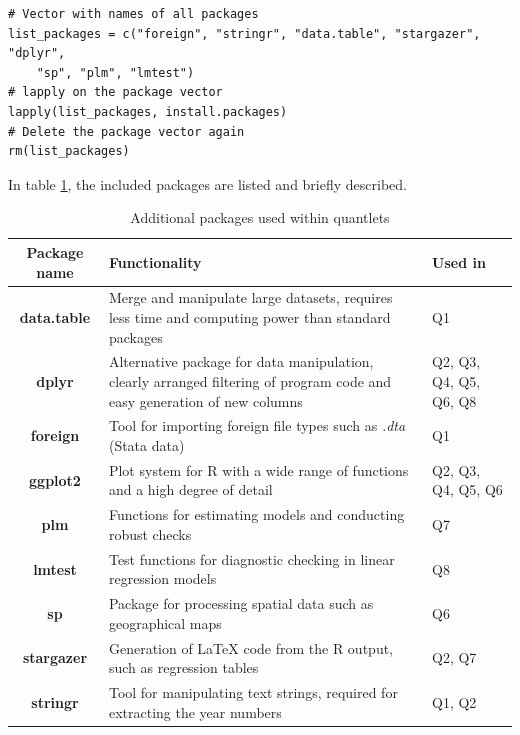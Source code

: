 \documentclass[a4paper]{article}
\begin{document}
\begin{lstlisting}[firstnumber=1]
# Vector with names of all packages
list_packages = c("foreign", "stringr", "data.table", "stargazer", "dplyr", 
	"sp", "plm", "lmtest")
# lapply on the package vector
lapply(list_packages, install.packages)
# Delete the package vector again
rm(list_packages)
\end{lstlisting}

In table \ref{table:packagelist}, the included packages are listed and briefly described.

\begin{table}[htbp]
	\centering
  	\caption{Additional packages used within quantlets} 
  	\label{table:packagelist} 
    \begin{tabular}{|c|p{10cm}|p{}|}
    \hline
    \textbf{Package name} & \textbf{Functionality} & \textbf{Used in} \\ \hline
    \textbf{data.table}   & Merge and manipulate large datasets, requires less time and computing power than standard packages             & Q1                 \\ \hline
    \textbf{dplyr}        & Alternative package for data manipulation, clearly arranged filtering of program code and easy generation of new columns        & Q2, Q3, Q4, Q5, Q6, Q8                 \\ \hline
    \textbf{foreign}      & Tool for importing foreign file types such as \textit{.dta} (Stata data)             & Q1                 \\ 
    \hline \textbf{ggplot2} & Plot system for R with a wide range of functions and a high degree of detail & Q2, Q3, Q4, Q5, Q6  \\
\hline \textbf{plm} & Functions for estimating models and conducting robust checks & Q7  \\
\hline
    \textbf{lmtest}           & Test functions for diagnostic checking in linear regression models              & Q8                 \\ 
    \hline
    \textbf{sp}           & Package for processing spatial data such as geographical maps             & Q6                 \\ 
    \hline \textbf{stargazer} & Generation of \LaTeX{} code from the R output, such as regression tables & Q2, Q7  \\
    \hline
    \textbf{stringr}      & Tool for manipulating text strings, required for extracting the year numbers             & Q1, Q2                 \\ \hline
    \end{tabular}
\end{table}
\end{document}
